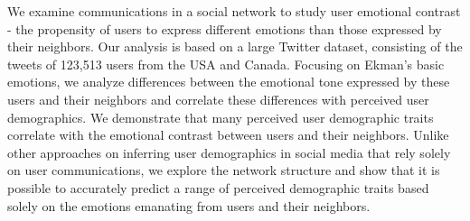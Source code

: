 We examine communications in a social network to study user emotional contrast - the propensity of users to express different emotions than those expressed by their neighbors. Our analysis is based on a large Twitter dataset, consisting of the tweets of 123,513 users from the USA and Canada. Focusing on Ekman's basic emotions, we analyze differences between the emotional tone expressed by these users and their neighbors and correlate these differences with perceived user demographics. We demonstrate that many perceived user demographic traits correlate with the emotional contrast between users and their neighbors. Unlike other approaches on inferring user demographics in social media that rely solely on user communications, we explore the network structure and show that it is possible to accurately predict a range of perceived demographic traits based solely on the emotions emanating from users and their neighbors.
